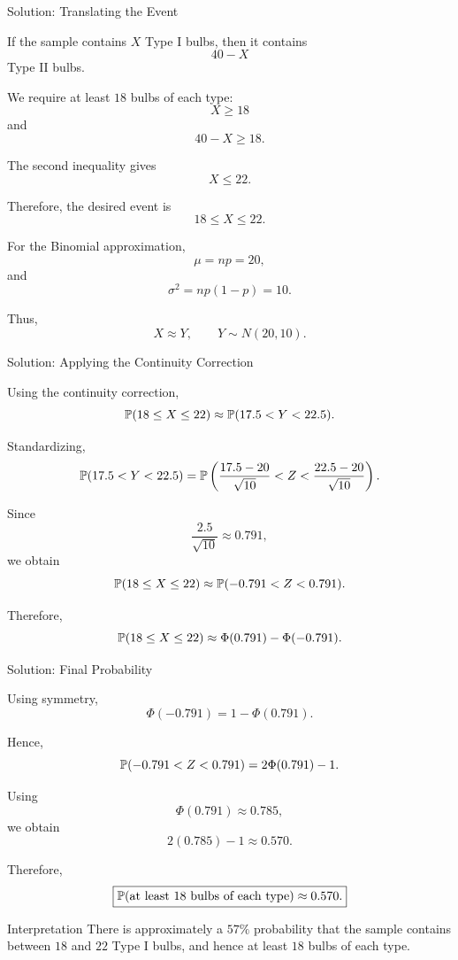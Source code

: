 \begin{frame}{Solution: Translating the Event}

If the sample contains \(X\) Type I bulbs, then it contains
\[
40-X
\]
Type II bulbs.

We require at least \(18\) bulbs of each type:
\[
X\geq18
\]
and
\[
40-X\geq18.
\]

The second inequality gives
\[
X\leq22.
\]

Therefore, the desired event is
\[
18\leq X\leq22.
\]

For the Binomial approximation,
\[
\mu=np=20,
\]
and
\[
\sigma^2=np(1-p)=10.
\]

Thus,
\[
X\approx Y,
\qquad
Y\sim N(20,10).
\]

\end{frame}


\begin{frame}{Solution: Applying the Continuity Correction}

Using the continuity correction,
\[
\mathbb{P}(18\leq X\leq22)
\approx
\mathbb{P}(17.5<Y<22.5).
\]

Standardizing,
\[
\mathbb{P}(17.5<Y<22.5)
=
\mathbb{P}\left(
\frac{17.5-20}{\sqrt{10}}
<
Z
<
\frac{22.5-20}{\sqrt{10}}
\right).
\]

Since
\[
\frac{2.5}{\sqrt{10}}
\approx0.791,
\]
we obtain
\[
\mathbb{P}(18\leq X\leq22)
\approx
\mathbb{P}(-0.791<Z<0.791).
\]

Therefore,
\[
\mathbb{P}(18\leq X\leq22)
\approx
\Phi(0.791)-\Phi(-0.791).
\]

\end{frame}


\begin{frame}{Solution: Final Probability}

Using symmetry,
\[
\Phi(-0.791)=1-\Phi(0.791).
\]

Hence,
\[
\mathbb{P}(-0.791<Z<0.791)
=
2\Phi(0.791)-1.
\]

Using
\[
\Phi(0.791)\approx0.785,
\]
we obtain
\[
2(0.785)-1
\approx
0.570.
\]

Therefore,
\[
\boxed{
\mathbb{P}(\text{at least 18 bulbs of each type})
\approx0.570.
}
\]

\begin{keybox}{Interpretation}
There is approximately a \(57\%\) probability that the sample contains
between \(18\) and \(22\) Type I bulbs, and hence at least \(18\) bulbs of
each type.
\end{keybox}

\end{frame}


